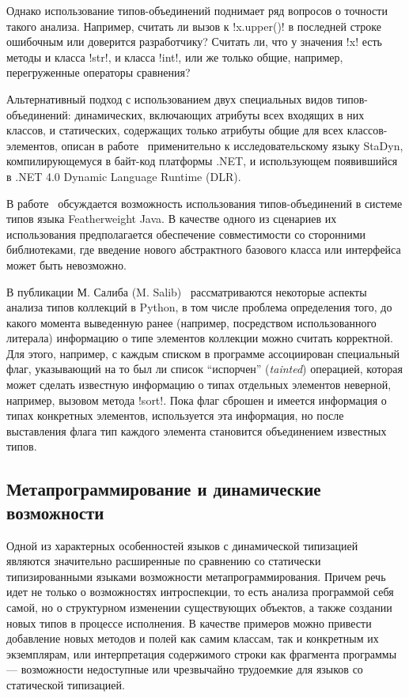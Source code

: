 Однако использование типов-объединений поднимает ряд вопросов о
точности такого анализа. Например, считать ли вызов к !x.upper()! в последней
строке ошибочным или доверится разработчику? Считать ли, что у значения !x! есть
методы и класса !str!, и класса !int!, или же только общие, например,
перегруженные операторы сравнения?

Альтернативный подход с использованием двух специальных видов типов-объединений:
динамических, включающих атрибуты всех входящих в них классов, и статических,
содержащих только атрибуты общие для всех классов-элементов, описан в
работе~\cite{Ortin2011:union} применительно к исследовательскому языку StaDyn,
компилирующемуся в байт-код платформы .NET, и использующем появившийся в .NET
4.0 Dynamic Language Runtime (DLR).


В работе~\cite{Igarashi2006} обсуждается возможность использования
типов-объединений в системе типов языка Featherweight Java. В качестве одного из
сценариев их использования предполагается обеспечение
совместимости со сторонними библиотеками, где введение нового абстрактного
базового класса или интерфейса может быть невозможно.  

В публикации М. Салиба (M. Salib)~\cite{Salib2004} рассматриваются некоторые аспекты анализа
типов коллекций в Python, в том числе проблема определения того, до какого
момента выведенную ранее (например, посредством использованного литерала)
информацию о типе элементов коллекции можно считать корректной. Для этого,
например, с каждым списком в программе ассоциирован специальный флаг,
указывающий на то был ли список ``испорчен'' (\emph{tainted}) операцией, которая
может сделать известную информацию о типах отдельных элементов неверной,
например, вызовом метода !sort!. Пока флаг сброшен и имеется информация о типах
конкретных элементов, используется эта информация, но после выставления флага
тип каждого элемента становится объединением известных типов.

\subsection{Метапрограммирование и динамические возможности}

Одной из характерных особенностей языков с динамической типизацией являются
значительно расширенные по сравнению со статически типизированными языками
возможности метапрограммирования. Причем речь идет не только о возможностях
интроспекции, то есть анализа программой себя самой, но о
структурном изменении существующих объектов, а также создании новых типов
в процессе исполнения. В качестве примеров можно привести добавление новых
методов и полей как самим классам, так и конкретным их экземплярам, или
интерпретация содержимого строки как фрагмента программы --- возможности
недоступные или чрезвычайно трудоемкие для языков со статической типизацией.

